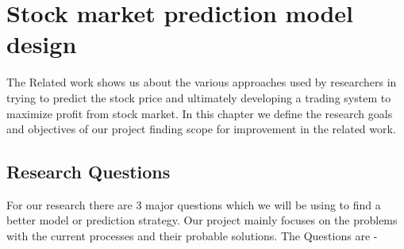 \documentclass[a4paper,12bp]{report}
\begin{document}
\chapter{Stock market prediction model design}

The Related work shows us about the various approaches used by researchers in trying to predict the stock price and ultimately developing a trading system to maximize profit from stock market. In this chapter we define the research goals and objectives of our project finding scope for improvement in the related work. 

\section{Research Questions}
For our research there are 3 major questions which we will be using to find a better model or prediction strategy. Our project mainly focuses on the problems with the current processes and their probable solutions. The Questions are - 
\end{document}
